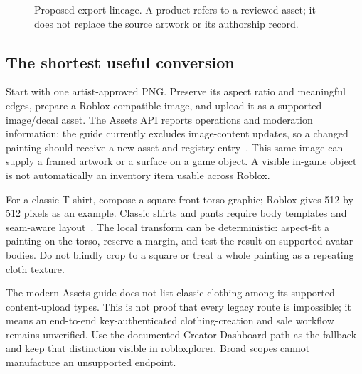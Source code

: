 \documentclass[10pt,letterpaper,twocolumn]{article}
\begin{document}
\begin{figure}[t]
\centering
{}
\caption{Proposed export lineage. A product refers to a reviewed asset; it does not replace the source artwork or its authorship record.}
\label{fig:lineage}
\end{figure}

\subsection{The shortest useful conversion}
Start with one artist-approved PNG. Preserve its aspect ratio and meaningful edges, prepare a Roblox-compatible image, and upload it as a supported image/decal asset. The Assets API reports operations and moderation information; the guide currently excludes image-content updates, so a changed painting should receive a new asset and registry entry~\cite{assets}. This same image can supply a framed artwork or a surface on a game object. A visible in-game object is not automatically an inventory item usable across Roblox.

For a classic T-shirt, compose a square front-torso graphic; Roblox gives 512 by 512 pixels as an example. Classic shirts and pants require body templates and seam-aware layout~\cite{clothing}. The local transform can be deterministic: aspect-fit a painting on the torso, reserve a margin, and test the result on supported avatar bodies. Do not blindly crop to a square or treat a whole painting as a repeating cloth texture.

The modern Assets guide does not list classic clothing among its supported content-upload types. This is not proof that every legacy route is impossible; it means an end-to-end key-authenticated clothing-creation and sale workflow remains unverified. Use the documented Creator Dashboard path as the fallback and keep that distinction visible in robloxplorer. Broad scopes cannot manufacture an unsupported endpoint.
\end{document}
